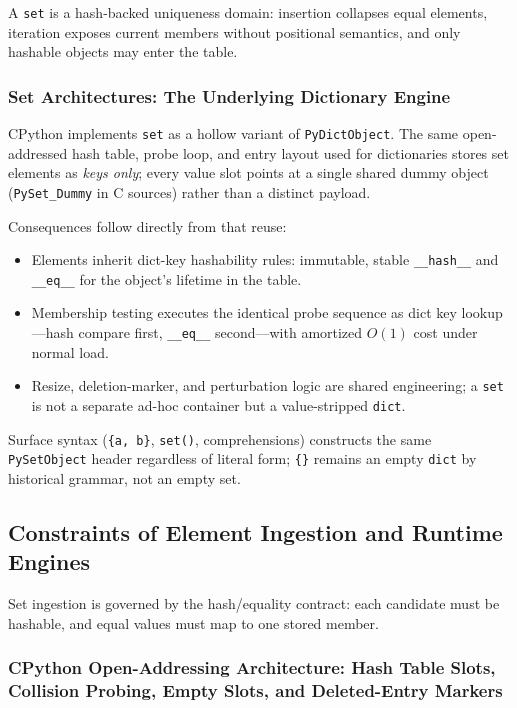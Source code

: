 \documentclass[a4paper,twoside]{report}
\begin{document}
A \texttt{set} is a hash-backed uniqueness domain: insertion collapses equal elements, iteration exposes current members without positional semantics, and only hashable objects may enter the table.

\subsubsection{Set Architectures: The Underlying Dictionary Engine}

CPython implements \texttt{set} as a hollow variant of \texttt{PyDictObject}. The same open-addressed hash table, probe loop, and entry layout used for dictionaries stores set elements as \emph{keys only}; every value slot points at a single shared dummy object (\texttt{PySet\_Dummy} in C sources) rather than a distinct payload.

Consequences follow directly from that reuse:

\begin{itemize}
    \item Elements inherit dict-key hashability rules: immutable, stable \texttt{\_\_hash\_\_} and \texttt{\_\_eq\_\_} for the object's lifetime in the table.
    \item Membership testing executes the identical probe sequence as dict key lookup---hash compare first, \texttt{\_\_eq\_\_} second---with amortized $O(1)$ cost under normal load.
    \item Resize, deletion-marker, and perturbation logic are shared engineering; a \texttt{set} is not a separate ad-hoc container but a value-stripped \texttt{dict}.
\end{itemize}

Surface syntax (\texttt{\{a, b\}}, \texttt{set()}, comprehensions) constructs the same \texttt{PySetObject} header regardless of literal form; \texttt{\{\}} remains an empty \texttt{dict} by historical grammar, not an empty set.


\subsection{Constraints of Element Ingestion and Runtime Engines}

Set ingestion is governed by the hash/equality contract: each candidate must be hashable, and equal values must map to one stored member.

\subsubsection{CPython Open-Addressing Architecture: Hash Table Slots, Collision Probing, Empty Slots, and Deleted-Entry Markers}
\end{document}
